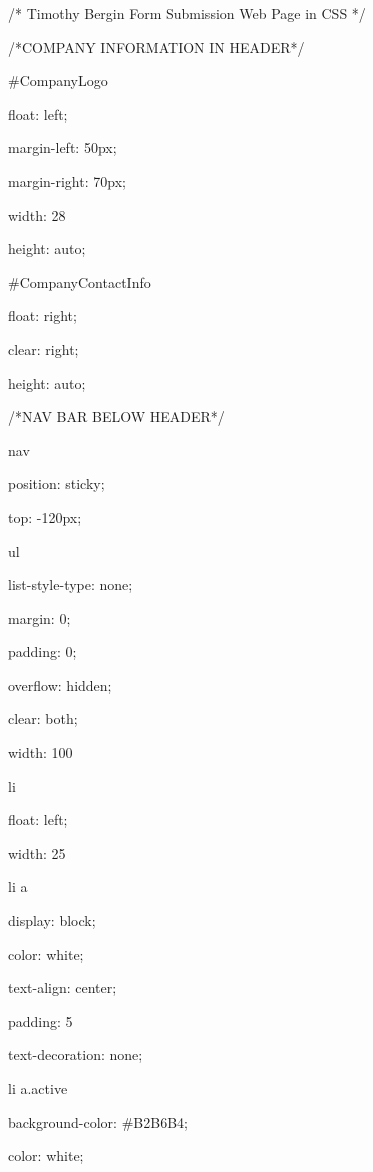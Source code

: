 
/* Timothy Bergin 
   Form Submission Web Page 
   in CSS
*/ 

/*COMPANY INFORMATION IN HEADER*/



#CompanyLogo{

	float: left;

	margin-left: 50px;

	margin-right: 70px;

	width: 28%

	height: auto;

	 }



#CompanyContactInfo{

	float: right;

	clear: right;

	height: auto;

	 }





/*NAV BAR BELOW HEADER*/



nav{

	position: sticky;

	top: -120px;



	 }



ul{

	list-style-type: none;

		margin: 0;

		padding: 0;

		overflow: hidden;

		clear: both;

		width: 100%

	}



li{

		float: left;

		width: 25%

	}



li a{

		display: block;

		color: white;

		text-align: center;

		padding: 5%

		text-decoration: none;

	}



li a.active{

		background-color: #B2B6B4;

		color: white;

	}



